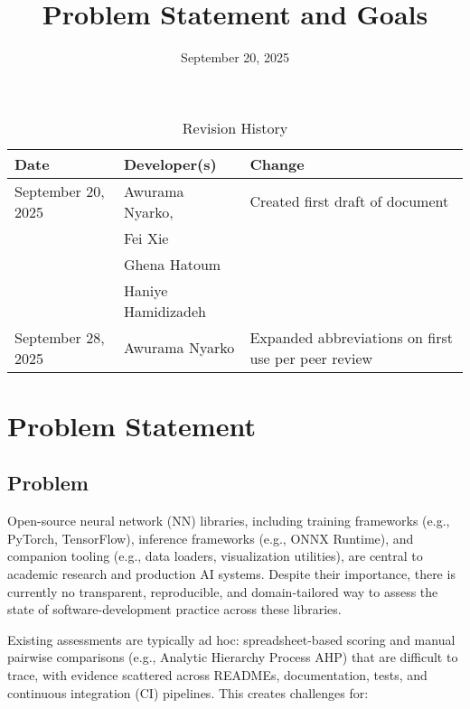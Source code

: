 \documentclass{article}
\title{Problem Statement and Goals\\\progname}
\author{\authname}
\date{September 20, 2025}
\begin{document}
\maketitle

\begin{table}[hp]
\caption{Revision History} \label{TblRevisionHistory}
\begin{tabularx}{\textwidth}{llX}
\toprule
\textbf{Date} & \textbf{Developer(s)} & \textbf{Change}\\
\midrule
September 20, 2025 & Awurama Nyarko, & Created first draft of document
 \\ & Fei Xie &
 \\ &Ghena Hatoum &
 \\ &Haniye Hamidizadeh &
 \\
September 28, 2025 & Awurama Nyarko & Expanded abbreviations on first use per peer review
 \\
\bottomrule
\end{tabularx}
\end{table}

\section{Problem Statement}



\subsection{Problem}
Open-source neural network (NN) libraries, including training frameworks
(e.g., PyTorch, TensorFlow), inference frameworks (e.g., ONNX Runtime),
and companion tooling (e.g., data loaders, visualization utilities), are central
to academic research and production AI systems. Despite their importance,
there is currently no transparent, reproducible, and domain-tailored way to
assess the state of software-development practice across these libraries.

Existing assessments are typically ad hoc: spreadsheet-based scoring and
manual pairwise comparisons (e.g., Analytic Hierarchy Process AHP) that are difficult to trace, with
evidence scattered across READMEs, documentation, tests, and continuous integration (CI)
pipelines. This creates challenges for:
\end{document}

